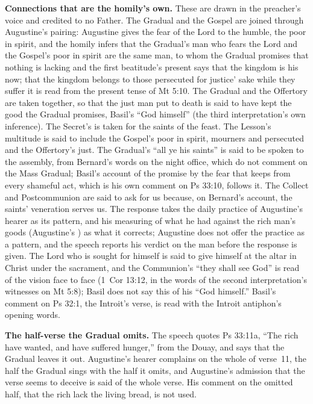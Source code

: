 {\textbf{Connections that are the homily's own.} These are drawn in the
preacher's voice and credited to no Father. The Gradual and the Gospel are
joined through Augustine's pairing: Augustine gives the fear of the Lord to
the humble, the poor in spirit, and the homily infers that the Gradual's man
who fears the Lord and the Gospel's poor in spirit are the same man, to whom
the Gradual promises that nothing is lacking and the first beatitude's
present says that the kingdom is his now; that the kingdom belongs to those
persecuted for justice' sake while they suffer it is read from the present
tense of Mt 5:10. The Gradual and the Offertory are taken together, so that
the just man put to death is said to have kept the good the Gradual
promises, Basil's ``God himself'' (the third interpretation's own
inference). The Secret's  is taken for the saints of the
feast. The Lesson's multitude is said to include the Gospel's poor in spirit,
mourners and persecuted and the Offertory's just. The Gradual's ``all ye his
saints'' is said to be spoken to the assembly, from Bernard's words on the
night office, which do not comment on the Mass Gradual; Basil's account of
the promise by the fear that keeps from every shameful act, which is his own
comment on Ps 33:10, follows it. The Collect and Postcommunion are said to
ask for us because, on Bernard's account, the saints' veneration serves us.
The response takes the daily practice of Augustine's hearer as its pattern,
and his measuring of what he had against the rich man's goods (Augustine's
) as what it
corrects; Augustine does not offer the practice as a pattern, and the speech
reports his verdict on the man before the response is given. The Lord who is
sought for himself is said to give himself at the altar in Christ under the
sacrament, and the Communion's ``they shall see God'' is read of the vision
face to face (1~Cor 13:12, in the words of the second interpretation's
witnesses on Mt 5:8); Basil does not say this of his ``God himself.''
Basil's comment on Ps 32:1, the Introit's verse, is read with the Introit
antiphon's opening words.

\textbf{The half-verse the Gradual omits.} The speech quotes Ps 33:11a, ``The
rich have wanted, and have suffered hunger,'' from the Douay, and says that
the Gradual leaves it out. Augustine's hearer complains on the whole of
verse~11, the half the Gradual sings with the half it omits, and Augustine's
admission that the verse seems to deceive is said of the whole verse. His
comment on the omitted half, that the rich lack the living bread, is not
used.

}
